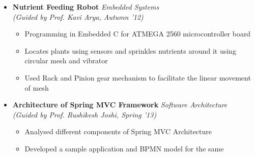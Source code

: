 \begin{itemize}
	\item \textbf{Nutrient Feeding Robot} \hfill \emph{Embedded Systems} \\
	\emph{(Guided by Prof. Kavi Arya, Autumn '12)} \hfill \\[-0.6cm]
	\begin{itemize}
	      \item Programming in Embedded C for ATMEGA 2560 microcontroller board \\[-0.5cm]
	      \item Locates plants using sensors and sprinkles nutrients around it using circular mesh and vibrator \\[-0.5cm]
	      \item Used Rack and Pinion gear mechanism to facilitate the linear movement of mesh \\[-0.6cm]
	\end{itemize}

	\item \textbf{Architecture of Spring MVC Framework} \hfill \emph{Software Architecture} \\
	\emph{(Guided by Prof. Rushikesh Joshi, Spring '13)} \hfill \\[-0.6cm]
	\begin{itemize}
	      \item Analysed different components of Spring MVC Architecture  \\[-0.5cm]
	      \item Developed a sample application and BPMN model for the same
	\end{itemize}

\end{itemize}

